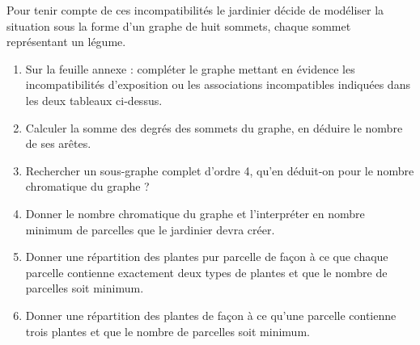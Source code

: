 \documentclass[]{prof}
\begin{document}
Pour tenir compte de ces incompatibilités le jardinier décide de modéliser la situation sous la forme d'un graphe de huit sommets, chaque sommet représentant un légume.
\medskip
\begin{enumerate}
\item Sur la feuille annexe : compléter le graphe mettant en évidence les incompatibilités d'exposition ou les associations incompatibles indiquées dans les deux tableaux ci-dessus.

\item Calculer la somme des degrés des sommets du graphe, en déduire le nombre de ses arêtes.

\item Rechercher un sous-graphe complet d'ordre 4, qu'en déduit-on pour le nombre chromatique du graphe ?

\item Donner le nombre chromatique du graphe et l'interpréter en nombre minimum de parcelles que le jardinier devra créer.

\item Donner une répartition des plantes pur parcelle de façon à ce que chaque parcelle contienne exactement deux types de plantes et que le nombre de parcelles soit minimum.

\item Donner une répartition des plantes de façon à ce qu'une parcelle contienne trois plantes et que le nombre de parcelles soit minimum.
\end{enumerate}

\medskip
\begin{center}
\end{center}

\vfill\newpage\null 
\end{document}
